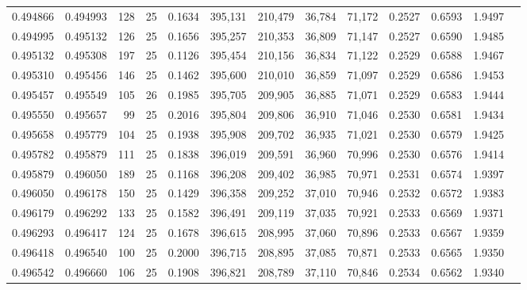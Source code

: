 \begin{tabular}{rrrrrrrrrrrrr}
0.494866 & 0.494993 &   128 &  25 &                                     0.1634 & 395,131 & 210,479 &  36,784 &  71,172 & 0.2527 & 0.6593 & 1.9497 \\
0.494995 & 0.495132 &   126 &  25 &                                     0.1656 & 395,257 & 210,353 &  36,809 &  71,147 & 0.2527 & 0.6590 & 1.9485 \\
0.495132 & 0.495308 &   197 &  25 &                                     0.1126 & 395,454 & 210,156 &  36,834 &  71,122 & 0.2529 & 0.6588 & 1.9467 \\
0.495310 & 0.495456 &   146 &  25 &                                     0.1462 & 395,600 & 210,010 &  36,859 &  71,097 & 0.2529 & 0.6586 & 1.9453 \\
0.495457 & 0.495549 &   105 &  26 &                                     0.1985 & 395,705 & 209,905 &  36,885 &  71,071 & 0.2529 & 0.6583 & 1.9444 \\
0.495550 & 0.495657 &    99 &  25 &                                     0.2016 & 395,804 & 209,806 &  36,910 &  71,046 & 0.2530 & 0.6581 & 1.9434 \\
0.495658 & 0.495779 &   104 &  25 &                                     0.1938 & 395,908 & 209,702 &  36,935 &  71,021 & 0.2530 & 0.6579 & 1.9425 \\
0.495782 & 0.495879 &   111 &  25 &                                     0.1838 & 396,019 & 209,591 &  36,960 &  70,996 & 0.2530 & 0.6576 & 1.9414 \\
0.495879 & 0.496050 &   189 &  25 &                                     0.1168 & 396,208 & 209,402 &  36,985 &  70,971 & 0.2531 & 0.6574 & 1.9397 \\
0.496050 & 0.496178 &   150 &  25 &                                     0.1429 & 396,358 & 209,252 &  37,010 &  70,946 & 0.2532 & 0.6572 & 1.9383 \\
0.496179 & 0.496292 &   133 &  25 &                                     0.1582 & 396,491 & 209,119 &  37,035 &  70,921 & 0.2533 & 0.6569 & 1.9371 \\
0.496293 & 0.496417 &   124 &  25 &                                     0.1678 & 396,615 & 208,995 &  37,060 &  70,896 & 0.2533 & 0.6567 & 1.9359 \\
0.496418 & 0.496540 &   100 &  25 &                                     0.2000 & 396,715 & 208,895 &  37,085 &  70,871 & 0.2533 & 0.6565 & 1.9350 \\
0.496542 & 0.496660 &   106 &  25 &                                     0.1908 & 396,821 & 208,789 &  37,110 &  70,846 & 0.2534 & 0.6562 & 1.9340 \\

\end{tabular}
